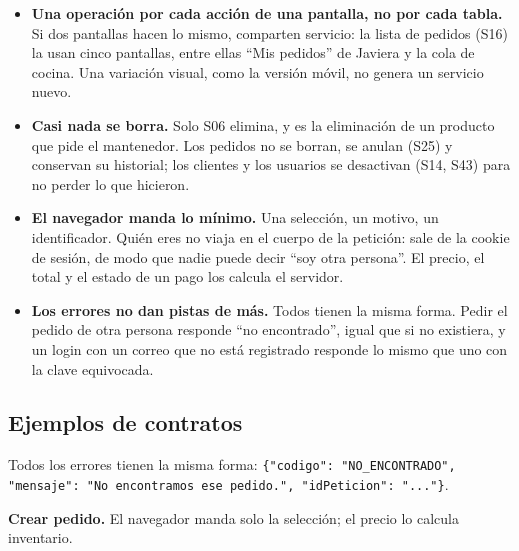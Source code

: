 \begin{itemize}[nosep,leftmargin=*]
\item \textbf{Una operación por cada acción de una pantalla, no por cada tabla.} Si dos pantallas hacen lo mismo, comparten servicio: la lista de pedidos (S16) la usan cinco pantallas, entre ellas “Mis pedidos” de Javiera y la cola de cocina. Una variación visual, como la versión móvil, no genera un servicio nuevo.
\item \textbf{Casi nada se borra.} Solo S06 elimina, y es la eliminación de un producto que pide el mantenedor. Los pedidos no se borran, se anulan (S25) y conservan su historial; los clientes y los usuarios se desactivan (S14, S43) para no perder lo que hicieron.
\item \textbf{El navegador manda lo mínimo.} Una selección, un motivo, un identificador. Quién eres no viaja en el cuerpo de la petición: sale de la cookie de sesión, de modo que nadie puede decir “soy otra persona”. El precio, el total y el estado de un pago los calcula el servidor.
\item \textbf{Los errores no dan pistas de más.} Todos tienen la misma forma. Pedir el pedido de otra persona responde “no encontrado”, igual que si no existiera, y un login con un correo que no está registrado responde lo mismo que uno con la clave equivocada.
\end{itemize}

\subsection{Ejemplos de contratos}

Todos los errores tienen la misma forma: \texttt{\{"codigo":\allowbreak{} "NO\_\allowbreak{}ENCONTRADO",\allowbreak{} "mensaje":\allowbreak{} "No encontramos ese pedido.\allowbreak{}",\allowbreak{} "idPeticion":\allowbreak{} ".\allowbreak{}.\allowbreak{}.\allowbreak{}"\}}.


\textbf{Crear pedido.} El navegador manda solo la selección; el precio lo calcula inventario.


